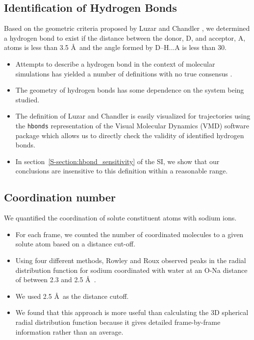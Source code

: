\documentclass{article}
\begin{document}
  \subsection*{Identification of Hydrogen Bonds}\label{method:hbonds}

  Based on the geometric criteria proposed by Luzar and Chandler \cite{luzar_effect_1996},
  we determined a hydrogen bond to exist if the distance between the donor, D, and acceptor,
  A, atoms is less than 3.5 \AA~and the angle formed by D--H...A is less than 30\degree.
  \begin{itemize}
    \item Attempts to describe a hydrogen bond in the context of molecular simulations has
    yielded a number of definitions with no true consensus \cite{prada-gracia_quest_2013}.
	\item The geometry of hydrogen bonds has some dependence on the system being studied. 
    \item The definition of Luzar and Chandler is easily visualized for trajectories using
    the \texttt{hbonds} representation of the Visual Molecular Dynamics (VMD) software 
    package which allows us to directly check the validity of identified hydrogen bonds.
    \item In section~\ref{S-section:hbond_sensitivity} of the SI, we show that our 
    conclusions are insensitive to this definition within a reasonable range.
  \end{itemize}

  \subsection*{Coordination number}\label{method:coordination}

  We quantified the coordination of solute constituent atoms with sodium ions.
  \begin{itemize}
  	\item For each frame, we counted the number of coordinated molecules to a
  	given solute atom based on a distance cut-off. 
  	\item Using four different methods, Rowley and Roux observed peaks in the
  	radial distribution function for sodium coordinated with water at an O-Na
  	distance of between 2.3 and 2.5 \AA~\cite{rowley_solvation_2012}. 
  	\item We used 2.5 \AA~as the distance cutoff.
  	\item We found that this approach is more useful than calculating the
	3D spherical radial distribution function because it gives detailed
	frame-by-frame information rather than an average. 
  \end{itemize}
  
\end{document}
